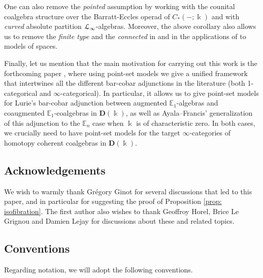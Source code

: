 \documentclass{proc-l}
\renewcommand{\mathcal}{\EuScript}
\theoremstyle{plain}
\theoremstyle{definition}
\theoremstyle{remark}
\newcommand{\kk}{\Bbbk}
\begin{document}
One can also remove the \textit{pointed} assumption by working with the counital coalgebra structure over the Barratt-Eccles operad of $C_*(-;\kk)$ and with \textit{curved} absolute partition $\mathcal{L}_\infty$-algebras. Moreover, the above corollary also allows us to remove the \textit{finite type} and the \textit{connected} in \cite[Theorem E]{lucio2024higherlietheorypositive} and in the applications of \cite[Theorem B]{lucio2024higherlietheorypositive} to models of spaces.

Finally, let us mention that the main motivation for carrying out this work is the forthcoming paper \cite{poinsetkoszul}, where using point-set models we give a unified framework that intertwines all the different bar-cobar adjunctions in the literature (both 1-categorical and $\infty$-categorical). In particular, it allows us to give point-set models for Lurie's bar-cobar adjunction between augmented $\mathbb{E}_1$-algebras and coaugmented $\mathbb{E}_1$-coalgebras in $\mathbf{D}(\kk)$, as well as Ayala--Francis' generalization of this adjunction to the $\mathbb{E}_n$ case when $\kk$ is of characteristic zero. In both cases, we crucially need to have point-set models for the target $\infty$-categories of homotopy coherent coalgebras in $\mathbf{D}(\kk)$.

\subsection*{Acknowledgements} We wish to warmly thank Gr{\'{e}}gory Ginot for several discussions that led to this paper, and in particular for suggesting the proof of Proposition \ref{prop: isofibration}. The first author also wishes to thank Geoffroy Horel, Brice Le Grignou and Damien Lejay for discussions about these and related topics.

\subsection*{Conventions}
Regarding notation, we will adopt the following conventions.
\end{document}
